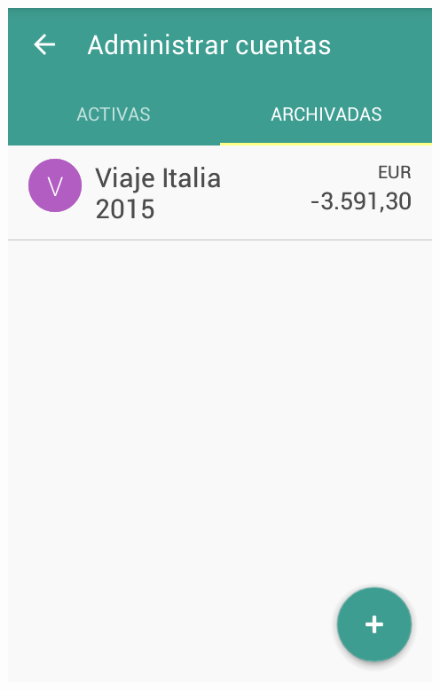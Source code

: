 \begin{figure}[ht]
\begin{minipage}{.5\textwidth}
\centering
  \includegraphics[scale=0.4,type=png,ext=.png,read=.png]{imagenes/archived_accounts}
  \captionsetup{justification=centering}
  \label{fig:interfazListarArchivedAccounts}
\end{minipage}
\end{figure}

